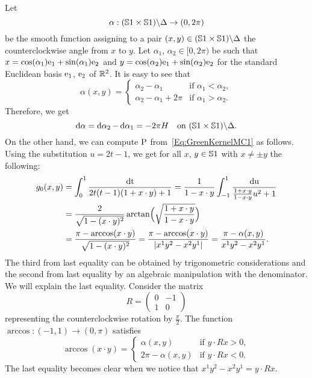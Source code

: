 \documentclass[\MainFolder/Text.tex]{subfiles}
\begin{document}
\begin{Example}\label{Example:Circle}%
\begin{ExampleList}
\item Let 
$$\alpha: (\mathbb{S}{1}\times\mathbb{S}{1})\backslash \Delta \rightarrow (0,2\pi)$$
be the smooth function assigning to a pair $(x,y)\in  (\mathbb{S}{1}\times\mathbb{S}{1})\backslash \Delta$ the counterclockwise angle from $x$ to $y$. Let $\alpha_1$, $\alpha_2 \in [0,2\pi)$ be such that $x=\cos(\alpha_1)\mathrm{e}_1 + \sin(\alpha_1)\mathrm{e}_2$ and $y=\cos(\alpha_2)\mathrm{e}_1+\sin(\alpha_2)\mathrm{e}_2$ for the standard Euclidean basis $\mathrm{e}_1$, $\mathrm{e}_2$ of $\mathbb{R}^2$. It is easy to see that
$$ \alpha(x,y) = \begin{cases} \alpha_2 - \alpha_1 & \text{if }\alpha_1<\alpha_2, \\
\alpha_2-\alpha_1+2\pi & \text{if }\alpha_1>\alpha_2. \end{cases} $$
Therefore, we get
$$ \operatorname{d\alpha} = \operatorname{d\alpha_2} -\operatorname{d\alpha_1} = -2\pi H \quad\text{on } (\mathbb{S}{1}\times\mathbb{S}{1})\backslash \Delta. $$
On the other hand, we can compute $\mathrm{P}$ from~\eqref{Eq:GreenKernelMC1} as follows. Using the substitution $u=2t-1$, we get for all $x$, $y\in \mathbb{S}{1}$ with $x\neq \pm y$ the following:
%
\begin{equation*}
\begin{aligned}
 g_{0}(x,y) &= \int_0^1 \frac{\operatorname{dt}}{2t(t-1)(1+x\cdot y) +1} =  \frac{1}{1-x\cdot y}\int_{-1}^1 \frac{\operatorname{du}}{\frac{1+x\cdot y}{1- x\cdot y}u^2 + 1} \\ &= \frac{2}{\sqrt{1-(x\cdot y)^2}}\arctan\Bigl(\sqrt{\frac{1+x\cdot y}{1-x\cdot y}}\Bigr) \\ &= \frac{\pi - \arccos(x\cdot y)}{\sqrt{1-(x\cdot y)^2}}  = \frac{\pi - \arccos(x\cdot y)}{ |x^1 y^2 - x^2 y^1|} = \frac{\pi - \alpha(x,y)}{x^1 y^2 - x^2 y^1}.
\end{aligned}
\end{equation*}
The third from last equality can be obtained by trigonometric considerations and the second from last equality by an algebraic manipulation with the denominator. We will explain the last equality. Consider the matrix 
$$ R=\begin{pmatrix}
0 & -1 \\ 1 & 0
\end{pmatrix} $$
representing the counterclockwise rotation by $\frac{\pi}{2}$. The function $\arccos: (-1,1) \rightarrow (0,\pi)$ satisfies
$$ \arccos(x\cdot y) = \begin{cases}
                        \alpha(x,y) & \text{if }y\cdot Rx > 0, \\
                        2\pi - \alpha(x,y) & \text{if }y\cdot Rx<0. 
                       \end{cases}$$
The last equality becomes clear when we notice that $x^1 y^2 - x^2 y^1 = y\cdot Rx$. 


\end{ExampleList}
\end{Example}
\end{document}
